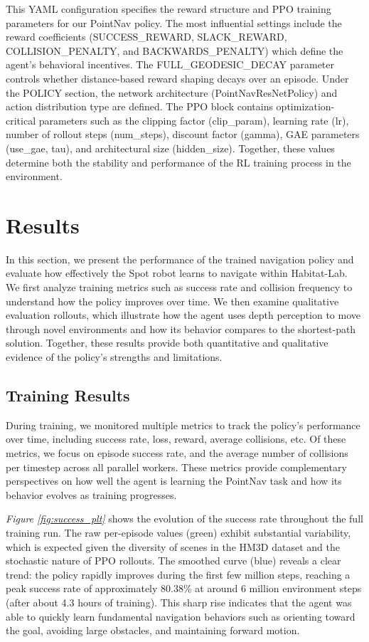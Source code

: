 \documentclass{article} %
\begin{document}
This YAML configuration specifies the reward structure and PPO training parameters for our PointNav policy. The most influential settings include the reward coefficients (SUCCESS\_REWARD, SLACK\_REWARD, COLLISION\_PENALTY, and BACKWARDS\_PENALTY) which define the agent's behavioral incentives. The FULL\_GEODESIC\_DECAY parameter controls whether distance-based reward shaping decays over an episode. Under the POLICY section, the network architecture (PointNavResNetPolicy) and action distribution type are defined. The PPO block contains optimization-critical parameters such as the clipping factor (clip\_param), learning rate (lr), number of rollout steps (num\_steps), discount factor (gamma), GAE parameters (use\_gae, tau), and architectural size (hidden\_size). Together, these values determine both the stability and performance of the RL training process in the environment.

\section{Results}
In this section, we present the performance of the trained navigation policy and evaluate how effectively the Spot robot learns to navigate within Habitat-Lab. We first analyze training metrics such as success rate and collision frequency to understand how the policy improves over time. We then examine qualitative evaluation rollouts, which illustrate how the agent uses depth perception to move through novel environments and how its behavior compares to the shortest-path solution. Together, these results provide both quantitative and qualitative evidence of the policy’s strengths and limitations.

\subsection{Training Results}
During training, we monitored multiple metrics to track the policy’s performance over time, including success rate, loss, reward, average collisions, etc. Of these metrics, we focus on episode success rate, and the average number of collisions per timestep across all parallel workers. These metrics provide complementary perspectives on how well the agent is learning the PointNav task and how its behavior evolves as training progresses.

\textit{Figure \ref{fig:success_plt}} shows the evolution of the success rate throughout the full training run. The raw per-episode values (green) exhibit substantial variability, which is expected given the diversity of scenes in the HM3D dataset and the stochastic nature of PPO rollouts. The smoothed curve (blue) reveals a clear trend: the policy rapidly improves during the first few million steps, reaching a peak success rate of approximately 80.38\% at around 6 million environment steps (after about 4.3 hours of training). This sharp rise indicates that the agent was able to quickly learn fundamental navigation behaviors such as orienting toward the goal, avoiding large obstacles, and maintaining forward motion.
\end{document}
